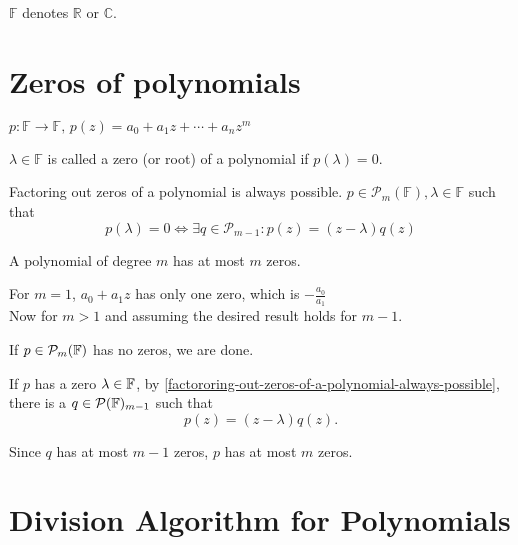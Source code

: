 $\mathbb{F}$ denotes $\mathbb{R}$ or $\mathbb{C}$.

\section{Zeros of polynomials}
$p: \mathbb{F} \to \mathbb{F}, \, p(z) = a_0 + a_1z + \cdots + a_n z^m$

\setcounter{thm}{4}
\begin{thm}
  $\lambda \in \mathbb{F}$ is called a zero (or root) of a polynomial if $p(\lambda) = 0$.
\end{thm}

\setcounter{thm}{5}
\begin{thm}
  \label{factororing-out-zeros-of-a-polynomial-always-possible}
  Factoring out zeros of a polynomial is always possible.
  $p \in \mathcal{P}_m(\mathbb{F}), \lambda \in \mathbb{F}$ such that 
  \begin{equation}
  	p(\lambda) = 0 \iff \exists q \in \mathcal{P}_{m-1}: p(z) = (z-\lambda)q(z)
  \end{equation}
\end{thm}

\setcounter{thm}{7}
\begin{thm}
  A polynomial of degree $m$ has at most $m$ zeros.
\end{thm}
\begin{prf}
  For $m=1$, $a_0+a_1z$ has only one zero, which is $-\frac{a_0}{a_1}$\\
  Now for $m>1$ and assuming the desired result holds for $m-1$. 
  
  If $p\in \mathcal{P}_{m}(\mathbb{F})$ has no zeros, we are done. 
  
  If $p$ has a zero $\lambda \in \mathbb{F}$, by \ref{factororing-out-zeros-of-a-polynomial-always-possible}, there is a $q \in \mathcal{P}(\mathbb{F})_{m-1}$ such that 
  \begin{equation}
  	p(z)=(z-\lambda)q(z).
  \end{equation}
   
  Since $q$ has at most $m-1$ zeros, $p$ has at most $m$ zeros.
  
\end{prf}

\section{Division Algorithm for Polynomials}

